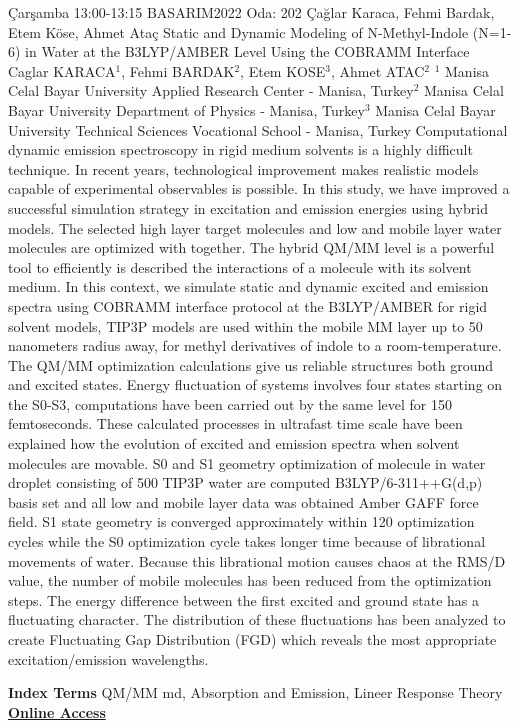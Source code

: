 
    \begin{abstract_basarim}
    {Çarşamba 13:00-13:15}
    {BASARIM2022}
    {Oda: 202}
    {Çağlar Karaca, Fehmi Bardak, Etem Köse, Ahmet Ataç}
    {Static and Dynamic Modeling of N-Methyl-Indole \newline\noindent (N=1-6) in Water at the B3LYP/AMBER Level Using the COBRAMM Interface}
    {%
    Caglar KARACA$^{1}$, Fehmi BARDAK$^{2}$, Etem KOSE$^{3}$, Ahmet ATAC$^{2}$}
    {%
    }
    {%
    $^1$ Manisa Celal Bayar University Applied Research Center - Manisa, Turkey\newline{}$^2$ Manisa Celal Bayar University Department of Physics - Manisa, Turkey\newline{}$^3$ Manisa Celal Bayar University Technical Sciences Vocational School - Manisa, Turkey}
    Computational dynamic emission spectroscopy in rigid medium solvents is a highly difficult technique. In recent years, technological improvement makes realistic models capable of experimental observables is possible. In this study, we have improved a successful simulation strategy in excitation and emission energies using hybrid models. The selected high layer target molecules and low and mobile layer water molecules are optimized with together. The hybrid QM/MM level is a powerful tool to efficiently is described the interactions of a molecule with its solvent medium. In this context, we simulate static and dynamic excited and emission spectra using COBRAMM interface protocol at the B3LYP/AMBER for rigid solvent models, TIP3P models are used within the mobile MM layer up to 50 nanometers radius away, for methyl derivatives of indole to a room-temperature. The QM/MM optimization calculations give us reliable structures both ground and excited states. Energy fluctuation of systems involves four states starting on the S0-S3, computations have been carried out by the same level for 150 femtoseconds. These calculated processes in ultrafast time scale have been explained how the evolution of excited and emission spectra when solvent molecules are movable. S0 and S1 geometry optimization of molecule in water droplet consisting of 500 TIP3P water are computed B3LYP/6-311++G(d,p) basis set and all low and mobile layer data was obtained Amber GAFF force field. S1 state geometry is converged approximately within 120 optimization cycles while the S0 optimization cycle takes longer time because of librational movements of water. Because this librational motion causes chaos at the RMS/D value, the number of mobile molecules has been reduced from the optimization steps. The energy difference between the first excited and ground state has a fluctuating character. The distribution of these fluctuations has been analyzed to create Fluctuating Gap Distribution (FGD) which reveals the most appropriate excitation/emission wavelengths. 
    
            \textbf{Index Terms} \newline{}QM/MM md, Absorption and Emission, Lineer Response Theory
     \newline\newline\noindent \href{https://drive.google.com/file/d/1BRTaqlguNsI36csXh_rUE5KExu1Plmkt/view?usp=drivesdk}{\bfseries Online Access}
    \end{abstract_basarim}
    